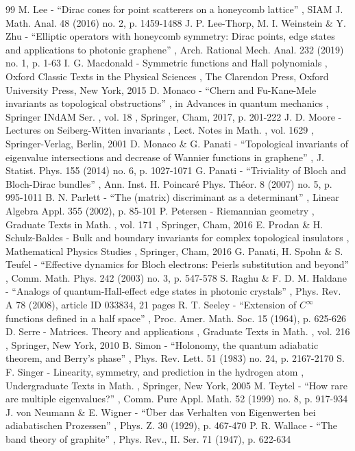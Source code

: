 \documentclass[11pt]{article}
\numberwithin{equation}{section}
\theoremstyle{definition}
\begin{document}
\begin{thebibliography}{99}
 M. Lee - “Dirac cones for point scatterers on a honeycomb lattice” , SIAM J. Math. Anal. 48 (2016) no. 2, p. 1459-1488
 J. P. Lee-Thorp, M. I. Weinstein \& Y. Zhu - “Elliptic operators with honeycomb symmetry: Dirac points, edge states and applications to photonic graphene” , Arch. Rational Mech. Anal. 232 (2019) no. 1, p. 1-63
 I. G. Macdonald - Symmetric functions and Hall polynomials , Oxford Classic Texts in the Physical Sciences , The Clarendon Press, Oxford University Press, New York, 2015
 D. Monaco - “Chern and Fu-Kane-Mele invariants as topological obstructions” , in Advances in quantum mechanics , Springer INdAM Ser. , vol. 18 , Springer, Cham, 2017, p. 201-222
 J. D. Moore - Lectures on Seiberg-Witten invariants , Lect. Notes in Math. , vol. 1629 , Springer-Verlag, Berlin, 2001
 D. Monaco \& G. Panati - “Topological invariants of eigenvalue intersections and decrease of Wannier functions in graphene” , J. Statist. Phys. 155 (2014) no. 6, p. 1027-1071
 G. Panati - “Triviality of Bloch and Bloch-Dirac bundles” , Ann. Inst. H. Poincaré Phys. Théor. 8 (2007) no. 5, p. 995-1011
 B. N. Parlett - “The (matrix) discriminant as a determinant” , Linear Algebra Appl. 355 (2002), p. 85-101
 P. Petersen - Riemannian geometry , Graduate Texts in Math. , vol. 171 , Springer, Cham, 2016
 E. Prodan \& H. Schulz-Baldes - Bulk and boundary invariants for complex topological insulators , Mathematical Physics Studies , Springer, Cham, 2016
 G. Panati, H. Spohn \& S. Teufel - “Effective dynamics for Bloch electrons: Peierls substitution and beyond” , Comm. Math. Phys. 242 (2003) no. 3, p. 547-578
 S. Raghu \& F. D. M. Haldane - “Analogs of quantum-Hall-effect edge states in photonic crystals” , Phys. Rev. A 78 (2008), article ID 033834, 21 pages
 R. T. Seeley - “Extension of $C^{\infty }$ functions defined in a half space” , Proc. Amer. Math. Soc. 15 (1964), p. 625-626
 D. Serre - Matrices. Theory and applications , Graduate Texts in Math. , vol. 216 , Springer, New York, 2010
 B. Simon - “Holonomy, the quantum adiabatic theorem, and Berry’s phase” , Phys. Rev. Lett. 51 (1983) no. 24, p. 2167-2170
 S. F. Singer - Linearity, symmetry, and prediction in the hydrogen atom , Undergraduate Texts in Math. , Springer, New York, 2005
 M. Teytel - “How rare are multiple eigenvalues?” , Comm. Pure Appl. Math. 52 (1999) no. 8, p. 917-934
 J. von Neumann \& E. Wigner - “Über das Verhalten von Eigenwerten bei adiabatischen Prozessen” , Phys. Z. 30 (1929), p. 467-470
 P. R. Wallace - “The band theory of graphite” , Phys. Rev., II. Ser. 71 (1947), p. 622-634
\end{thebibliography}
\end{document}
